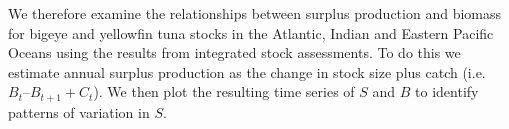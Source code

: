 \documentclass[12pt,doublespacing,a4paper]{ouparticle}
\begin{document}
\begin{itemize}[topsep=0pt,itemsep=0ex,partopsep=0ex,parsep=0ex]
\end{itemize}

We therefore examine the relationships between surplus production and biomass  for bigeye and yellowfin tuna stocks in the Atlantic, Indian and Eastern Pacific Oceans using the results from integrated stock assessments. To do this we estimate annual surplus production as the change in stock size plus catch (i.e. $B_t – B_{t+1} + C_t$). We then plot the resulting time series of $S$ and $B$ to identify patterns of variation in $S$. 
\end{document}
